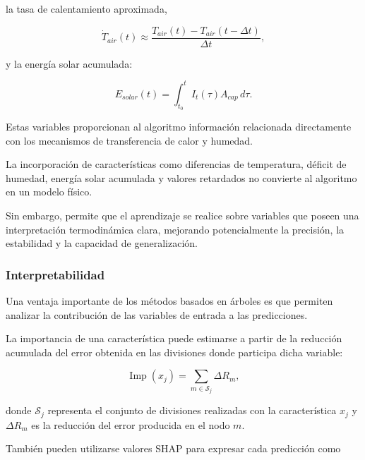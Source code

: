la tasa de calentamiento aproximada,

\begin{equation}
\dot{T}_{air}(t)
\approx
\frac{
T_{air}(t)-T_{air}(t-\Delta t)
}
{\Delta t},
\end{equation}

y la energía solar acumulada:

\begin{equation}
E_{solar}(t)
=
\int_{t_0}^{t}
I_t(\tau)A_{cap}\,d\tau.
\end{equation}

Estas variables proporcionan al algoritmo información relacionada directamente con los mecanismos de transferencia de calor y humedad.

\begin{tcolorbox}[
title=Datos informados por la física,
colback=yellow!5,
colframe=orange!70!black
]
La incorporación de características como diferencias de temperatura, déficit de humedad, energía solar acumulada y valores retardados no convierte al algoritmo en un modelo físico.

Sin embargo, permite que el aprendizaje se realice sobre variables que poseen una interpretación termodinámica clara, mejorando potencialmente la precisión, la estabilidad y la capacidad de generalización.
\end{tcolorbox}

\subsubsection{Interpretabilidad}

Una ventaja importante de los métodos basados en árboles es que permiten analizar la contribución de las variables de entrada a las predicciones.

La importancia de una característica puede estimarse a partir de la reducción acumulada del error obtenida en las divisiones donde participa dicha variable:

\begin{equation}
\operatorname{Imp}(x_j)
=
\sum_{m\in\mathcal{S}_j}
\Delta R_m,
\end{equation}

donde $\mathcal{S}_j$ representa el conjunto de divisiones realizadas con la característica $x_j$ y $\Delta R_m$ es la reducción del error producida en el nodo $m$.

También pueden utilizarse valores SHAP para expresar cada predicción como

